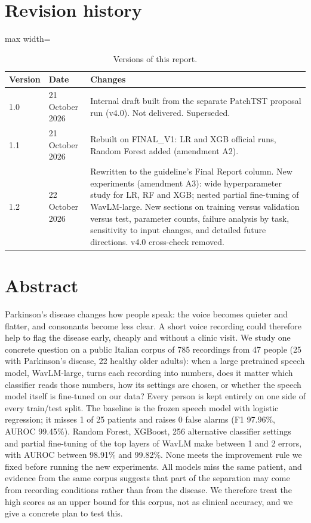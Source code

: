 \documentclass[11pt,a4paper]{article}
\begin{document}
\section*{Revision history}
\begin{table}[H]\centering\footnotesize\renewcommand{\arraystretch}{1.15}
\caption{Versions of this report.}
\begin{adjustbox}{max width=\linewidth}\begin{tabular}{llp{11.4cm}}
\toprule
\textbf{Version} & \textbf{Date} & \textbf{Changes}\\
\midrule
1.0 & 21 October 2026 & Internal draft built from the separate PatchTST proposal run (v4.0). Not delivered. Superseded.\\
1.1 & 21 October 2026 & Rebuilt on FINAL\_V1: LR and XGB official runs, Random Forest added (amendment A2).\\
1.2 & 22 October 2026 & Rewritten to the guideline's Final Report column. New experiments (amendment A3): wide hyperparameter study for LR, RF and XGB; nested partial fine-tuning of WavLM-large. New sections on training versus validation versus test, parameter counts, failure analysis by task, sensitivity to input changes, and detailed future directions. v4.0 cross-check removed.\\
\bottomrule
\end{tabular}\end{adjustbox}\end{table}
\section{Abstract}\label{sec:abstract}
Parkinson's disease changes how people speak: the voice becomes quieter and flatter, and consonants become less clear. A short voice recording could therefore help to flag the disease early, cheaply and without a clinic visit. We study one concrete question on a public Italian corpus of 785 recordings from 47 people (25 with Parkinson's disease, 22 healthy older adults): when a large pretrained speech model, WavLM-large, turns each recording into numbers, does it matter which classifier reads those numbers, how its settings are chosen, or whether the speech model itself is fine-tuned on our data? Every person is kept entirely on one side of every train/test split. The baseline is the frozen speech model with logistic regression; it misses 1 of 25 patients and raises 0 false alarms (F1 97.96\%, AUROC 99.45\%). Random Forest, XGBoost, 256 alternative classifier settings and partial fine-tuning of the top layers of WavLM make between 1 and 2 errors, with AUROC between 98.91\% and 99.82\%. None meets the improvement rule we fixed before running the new experiments. All models miss the same patient, and evidence from the same corpus suggests that part of the separation may come from recording conditions rather than from the disease. We therefore treat the high scores as an upper bound for this corpus, not as clinical accuracy, and we give a concrete plan to test this.
\end{document}
